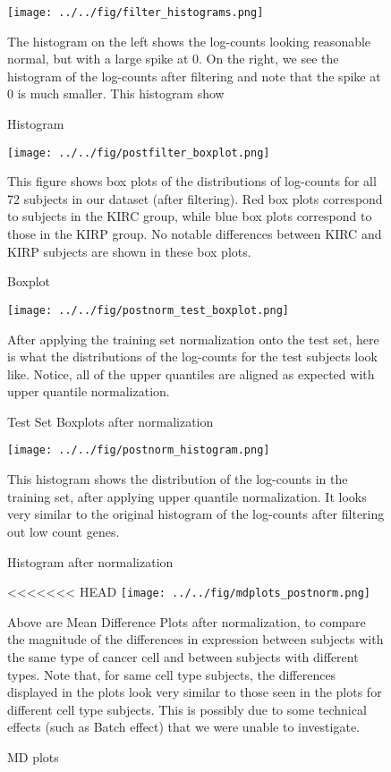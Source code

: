 \begin{figure}[H]
  \centering
    \texttt{[image: ../../fig/filter\_histograms.png]}
\caption{Histogram } The histogram on the left shows the log-counts looking reasonable normal, but with a large spike at 0.
				On the right, we see the histogram of the log-counts after filtering and note that the spike at 0 is much smaller.
				This histogram show
   \label{fig:histogram}
\end{figure}


\begin{figure}[H]
  \centering
    \texttt{[image: ../../fig/postfilter\_boxplot.png]}
\caption{Boxplot } This figure shows box plots of the distributions of log-counts for all 72 subjects in our dataset (after filtering). Red 	box plots correspond to subjects in the KIRC group, while blue box plots correspond to those in the KIRP group. No notable 	differences between KIRC and KIRP subjects are shown in these box plots. 
   \label{fig:boxplot}
\end{figure}


\begin{figure}[H]
  \centering
    \texttt{[image: ../../fig/postnorm\_test\_boxplot.png]}
\caption{Test Set Boxplots after normalization } After applying the training set normalization onto the test set, here is what the
		distributions of the log-counts for the test subjects look like. Notice, all of the upper quantiles are aligned as expected 		with upper quantile normalization.
   \label{fig:boxplotpost}
\end{figure}


\begin{figure}[H]
  \centering
    \texttt{[image: ../../fig/postnorm\_histogram.png]}
\caption{Histogram after normalization  } This histogram shows the distribution of the log-counts in the training set, after applying upper quantile normalization. It looks very similar to the original histogram of the log-counts after filtering out low count genes.
   \label{fig:histogram}
\end{figure}

\begin{figure}[H]
  \centering
<<<<<<< HEAD
    \texttt{[image: ../../fig/mdplots\_postnorm.png]}
\caption{MD plots } Above are Mean Difference Plots after normalization, to compare the magnitude of the differences in expression
				between subjects with the same type of cancer cell and between subjects with different types.
				Note that, for same cell type subjects, the differences displayed in the plots look very similar to those 
				seen in the plots for different cell type subjects. This is possibly due to some technical effects (such as Batch 				effect) that we were unable to investigate.
   \label{fig:mdplot}
\end{figure}


